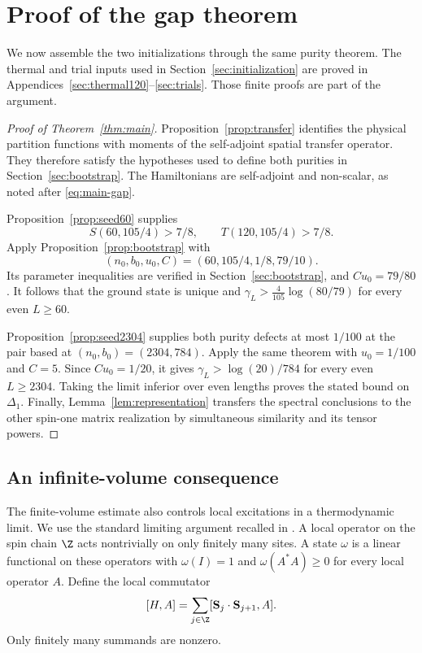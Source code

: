 \section{Proof of the gap theorem}\label{sec:assembly}

We now assemble the two initializations through the same purity theorem.
The thermal and trial inputs used in Section~\ref{sec:initialization}
are proved in Appendices~\ref{sec:thermal120}--\ref{sec:trials}.
Those finite proofs are part of the argument.

\begin{proof}[Proof of Theorem~\ref{thm:main}]
Proposition~\ref{prop:transfer} identifies the physical partition
functions with moments of the self-adjoint spatial transfer operator.
They therefore satisfy the hypotheses used to define both purities in
Section~\ref{sec:bootstrap}. The Hamiltonians are self-adjoint and
non-scalar, as noted after \eqref{eq:main-gap}.

Proposition~\ref{prop:seed60} supplies
\[
 S(60,105/4)>7/8,\qquad T(120,105/4)>7/8.
\]
Apply Proposition~\ref{prop:bootstrap} with
\[
 (n_0,b_0,u_0,C)=(60,105/4,1/8,79/10).
\]
Its parameter inequalities are verified in
Section~\ref{sec:bootstrap}, and $Cu_0=79/80$.
It follows that the ground state is unique and
$\gamma_L>\frac4{105}\log(80/79)$ for every even $L\ge60$.

Proposition~\ref{prop:seed2304} supplies both purity defects at most
$1/100$ at the pair based at $(n_0,b_0)=(2304,784)$.
Apply the same theorem with $u_0=1/100$ and $C=5$.
Since $Cu_0=1/20$, it gives
$\gamma_L>\log(20)/784$ for every even $L\ge2304$.
Taking the limit inferior over even lengths proves the stated bound
on $\Delta_1$. Finally, Lemma~\ref{lem:representation} transfers the
spectral conclusions to the other spin-one matrix realization by
simultaneous similarity and its tensor powers.
\end{proof}

\subsection{An infinite-volume consequence}

The finite-volume estimate also controls local excitations in a
thermodynamic limit. We use the standard limiting argument recalled in
\cite[arXiv v4, End Matter, Definition~11 and Theorem~12]{Tasaki2025}.
A local operator on the spin chain $\Z$ acts nontrivially on only
finitely many sites. A state $\omega$ is a linear functional on these
operators with $\omega(I)=1$ and $\omega(A^*A)\ge0$ for every local
operator $A$. Define the local commutator
\[
 [H,A]=\sum_{j\in\Z}
 [\mathbf S_j\cdot\mathbf S_{j+1},A].
\]
Only finitely many summands are nonzero.

